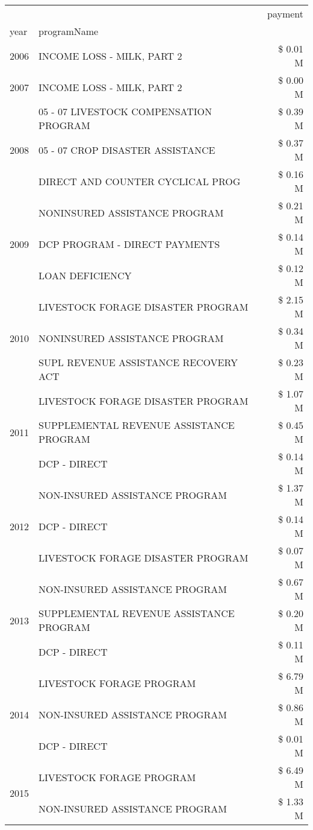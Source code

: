 \begin{tabular}{llr}
\toprule
 &  & payment \\
year & programName &  \\
\midrule
2006 & INCOME LOSS - MILK, PART 2 & \$ 0.01 M \\
\cline{1-3}
2007 & INCOME LOSS - MILK, PART 2 & \$ 0.00 M \\
\cline{1-3}
\multirow[t]{3}{*}{2008} & 05 - 07 LIVESTOCK COMPENSATION PROGRAM & \$ 0.39 M \\
 & 05 - 07 CROP DISASTER ASSISTANCE & \$ 0.37 M \\
 & DIRECT AND COUNTER CYCLICAL PROG & \$ 0.16 M \\
\cline{1-3}
\multirow[t]{3}{*}{2009} & NONINSURED ASSISTANCE PROGRAM & \$ 0.21 M \\
 & DCP PROGRAM - DIRECT PAYMENTS & \$ 0.14 M \\
 & LOAN DEFICIENCY & \$ 0.12 M \\
\cline{1-3}
\multirow[t]{3}{*}{2010} & LIVESTOCK FORAGE DISASTER  PROGRAM & \$ 2.15 M \\
 & NONINSURED ASSISTANCE PROGRAM & \$ 0.34 M \\
 & SUPL REVENUE ASSISTANCE RECOVERY ACT & \$ 0.23 M \\
\cline{1-3}
\multirow[t]{3}{*}{2011} & LIVESTOCK FORAGE DISASTER PROGRAM & \$ 1.07 M \\
 & SUPPLEMENTAL REVENUE ASSISTANCE PROGRAM & \$ 0.45 M \\
 & DCP - DIRECT & \$ 0.14 M \\
\cline{1-3}
\multirow[t]{3}{*}{2012} & NON-INSURED ASSISTANCE PROGRAM & \$ 1.37 M \\
 & DCP - DIRECT & \$ 0.14 M \\
 & LIVESTOCK FORAGE DISASTER PROGRAM & \$ 0.07 M \\
\cline{1-3}
\multirow[t]{3}{*}{2013} & NON-INSURED ASSISTANCE PROGRAM & \$ 0.67 M \\
 & SUPPLEMENTAL REVENUE ASSISTANCE PROGRAM & \$ 0.20 M \\
 & DCP - DIRECT & \$ 0.11 M \\
\cline{1-3}
\multirow[t]{3}{*}{2014} & LIVESTOCK FORAGE PROGRAM & \$ 6.79 M \\
 & NON-INSURED ASSISTANCE PROGRAM & \$ 0.86 M \\
 & DCP - DIRECT & \$ 0.01 M \\
\cline{1-3}
\multirow[t]{3}{*}{2015} & LIVESTOCK FORAGE PROGRAM & \$ 6.49 M \\
 & NON-INSURED ASSISTANCE PROGRAM & \$ 1.33 M \\

\end{tabular}
